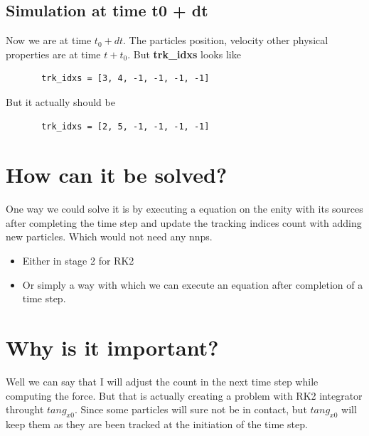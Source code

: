 \documentclass[11pt]{article}
\begin{document}
\subsection{Simulation at time t0 + dt}
\label{sec:orgfc090d7}
Now we are at time \(t_0 + dt\). The particles position, velocity other physical
properties are at time \(t+t_0\). But \textbf{trk\_idxs} looks like

\begin{verbatim}
       trk_idxs = [3, 4, -1, -1, -1, -1]
\end{verbatim}

But it actually should be

\begin{verbatim}
       trk_idxs = [2, 5, -1, -1, -1, -1]
\end{verbatim}


\section{How can it be solved?}
\label{sec:orgc55cda5}
One way we could solve it is by executing a equation on the enity with its
sources after completing the time step and update the tracking indices count
with adding new particles. Which would not need any nnps.

\begin{itemize}
\item Either in stage 2 for RK2
\item Or simply a way with which we can execute an equation after completion of a
time step.
\end{itemize}



\section{Why is it important?}
\label{sec:orgd525cbf}
Well we can say that I will adjust the count in the next time step while
computing the force. But that is actually creating a problem with RK2
integrator throught \(tang_{x0}\). Since some particles will sure not be in
contact, but \(tang_{x0}\) will keep them as they are been tracked at the
initiation of the time step.




\end{document}
